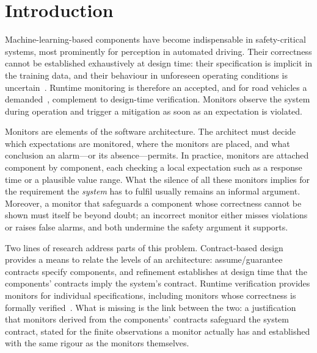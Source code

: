 \section{Introduction}\label{sec:introduction}

Machine-learning-based components have become indispensable in safety-critical systems, most prominently for perception in automated driving. Their correctness cannot be established exhaustively at design time: their specification is implicit in the training data, and their behaviour in unforeseen operating conditions is uncertain~\cite{ISO21448}. Runtime monitoring is therefore an accepted, and for road vehicles a demanded~\cite{ISOPAS8800}, complement to design-time verification. Monitors observe the system during operation and trigger a mitigation as soon as an expectation is violated.

Monitors are elements of the software architecture. The architect must decide which expectations are monitored, where the monitors are placed, and what conclusion an alarm---or its absence---permits. In practice, monitors are attached component by component, each checking a local expectation such as a response time or a plausible value range. What the silence of all these monitors implies for the requirement the \emph{system} has to fulfil usually remains an informal argument. Moreover, a monitor that safeguards a component whose correctness cannot be shown must itself be beyond doubt; an incorrect monitor either misses violations or raises false alarms, and both undermine the safety argument it supports.

Two lines of research address parts of this problem. Contract-based design~\cite{Benveniste2018,CimattiTonetta2015} provides a means to relate the levels of an architecture: assume/guarantee contracts specify components, and refinement establishes at design time that the components' contracts imply the system's contract. Runtime verification provides monitors for individual specifications, including monitors whose correctness is formally verified~\cite{Schneider2019,Finkbeiner2020,Scott2023}. What is missing is the link between the two: a justification that monitors derived from the components' contracts safeguard the system contract, stated for the finite observations a monitor actually has and established with the same rigour as the monitors themselves.

